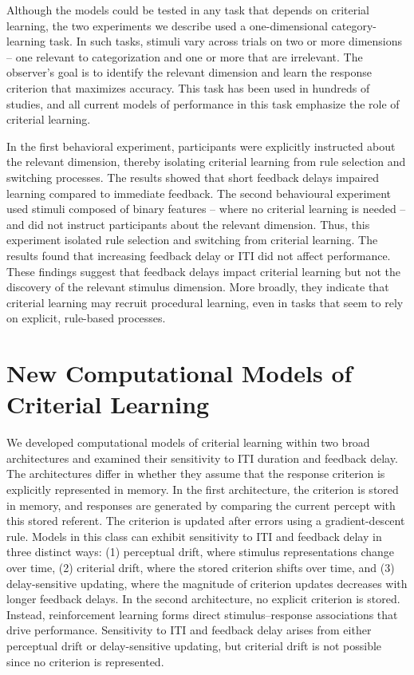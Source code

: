 \documentclass[doc, floatsintext]{apa7}
\begin{document}
Although the models could be tested in any task that depends
on criterial learning, the two experiments we describe used
a one-dimensional category-learning task. In such tasks,
stimuli vary across trials on two or more dimensions -- one
relevant to categorization and one or more that are
irrelevant. The observer's goal is to identify the relevant
dimension and learn the response criterion that maximizes
accuracy. This task has been used in hundreds of studies,
and all current models of performance in this task emphasize
the role of criterial learning.

In the first behavioral experiment, participants were
explicitly instructed about the relevant dimension, thereby
isolating criterial learning from rule selection and
switching processes. The results showed that short feedback
delays impaired learning compared to immediate feedback.
The second behavioural experiment used stimuli composed of
binary features -- where no criterial learning is needed --
and did not instruct participants about the relevant
dimension. Thus, this experiment isolated rule selection and
switching from criterial learning. The results found that
increasing feedback delay or ITI did not affect performance.
These findings suggest that feedback delays impact criterial
learning but not the discovery of the relevant stimulus
dimension.  More broadly, they indicate that criterial
learning may recruit procedural learning, even in tasks that
seem to rely on explicit, rule-based processes.

\section{New Computational Models of Criterial Learning}
We developed computational models of criterial learning
within two broad architectures and examined their
sensitivity to ITI duration and feedback delay. The
architectures differ in whether they assume that the
response criterion is explicitly represented in memory. In
the first architecture, the criterion is stored in memory,
and responses are generated by comparing the current percept
with this stored referent. The criterion is updated after
errors using a gradient-descent rule. Models in this class
can exhibit sensitivity to ITI and feedback delay in three
distinct ways: (1) perceptual drift, where stimulus
representations change over time, (2) criterial drift, where
the stored criterion shifts over time, and (3)
delay-sensitive updating, where the magnitude of criterion
updates decreases with longer feedback delays. In the second
architecture, no explicit criterion is stored.  Instead,
reinforcement learning forms direct stimulus--response
associations that drive performance.  Sensitivity to ITI and
feedback delay arises from either perceptual drift or
delay-sensitive updating, but criterial drift is not
possible since no criterion is represented.
\end{document}
